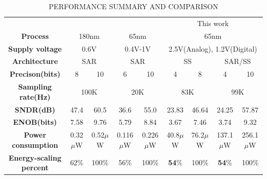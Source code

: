 \begin{table}[htbp]
	\caption{PERFORMANCE SUMMARY AND COMPARISON}
	\begin{center}
		\begin{tabular}{|c|c|c|c|c|c|c|c|c|}
			\hline
			\textbf{}& \multicolumn{2}{|c|}{\cite{zhu_06_2013}} & \multicolumn{2}{|c|}{\cite{yip_resolution-reconfigurable_2013}} & \multicolumn{4}{|c|}{This work} \\
			\hhline{|=========|}
			\textbf{Process}& \multicolumn{2}{|c|}{180nm} & \multicolumn{2}{|c|}{65nm} & \multicolumn{4}{|c|}{65nm} \\
			\hline 
			\textbf{Supply voltage}& \multicolumn{2}{|c|}{0.6V} & \multicolumn{2}{|c|}{0.4V-1V} & \multicolumn{4}{|c|}{2.5V(Analog), 1.2V(Digital)} \\
			\hline
			
			\textbf{Architecture}& \multicolumn{2}{|c|}{SAR} & \multicolumn{2}{|c|}{SAR} & \multicolumn{2}{|c|}{SS} & \multicolumn{2}{|c|}{SAR/SS}\\
			\hline
			\textbf{Precison(bits)} & 8 & 10 & 6 & 10 & 4 & 8 & 4 & 10 \\
			\hline
			\textbf{Sampling rate(Hz)}& \multicolumn{2}{|c|}{100K} & \multicolumn{2}{|c|}{20K} & \multicolumn{2}{|c|}{83K} & \multicolumn{2}{|c|}{99K} \\
			\hline
			\textbf{SNDR(dB)} & 47.4 & 60.5 & 36.6 & 55.0 & 23.83 & 46.64 & 24.25 & 57.87 \\
			\hline
			\textbf{ENOB(bits)}& 7.58 & 9.76 & 5.79 & 8.84 & 3.67 & 7.46 & 3.74 & 9.32 \\
			\hline
			\textbf{Power consumption}& 0.32$\mu$W & 0.52$\mu$W &  0.116$\mu$W & 0.226$\mu$W & 40.8$\mu$W & 76.2$\mu$W & 137.1$\mu$W & 256.1$\mu$W\\
			\hline
			\textbf{Energy-scaling percent}& 62\% & 100\% & 56\% & 100\% & \textbf{54}\% & 100\% & \textbf{54}\% & 100\% \\
			\hline
		\end{tabular}
		\label{tab1}
	\end{center}
\end{table}